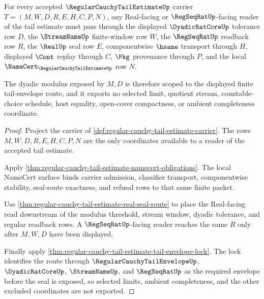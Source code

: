 \begin{theorem}
\label{thm:regular-cauchy-tail-estimate-dyadic-modulus-scope}
For every accepted $\RegularCauchyTailEstimateUp$ carrier
$T=(M,W,D,R,E,H,C,P,N)$, any Real-facing or $\RegSeqRatUp$-facing reader of the tail estimate must pass through the displayed $\DyadicRatCoreUp$ tolerance row $D$, the $\StreamNameUp$ finite-window row $W$, the $\RegSeqRatUp$ readback row $R$, the $\RealUp$ seal row $E$, componentwise $\hsame$ transport through $H$, displayed $\Cont$ replay through $C$, $\Pkg$ provenance through $P$, and the local $\NameCert_{\RegularCauchyTailEstimateUp}$ row $N$.

The dyadic modulus exposed by $M,D$ is therefore scoped to the displayed finite tail-envelope route, and it exports no selected limit, quotient stream, countable-choice schedule, host equality, open-cover compactness, or ambient completeness coordinate.
\end{theorem}
\begin{proof}
Project the carrier of \autoref{def:regular-cauchy-tail-estimate-carrier}. The rows $M,W,D,R,E,H,C,P,N$ are the only coordinates available to a reader of the accepted tail estimate.

Apply \autoref{thm:regular-cauchy-tail-estimate-namecert-obligations}. The local NameCert surface binds carrier admission, classifier transport, componentwise stability, seal-route exactness, and refusal rows to that same finite packet.

Use \autoref{thm:regular-cauchy-tail-estimate-real-seal-route} to place the Real-facing read downstream of the modulus threshold, stream window, dyadic tolerance, and regular readback rows. A $\RegSeqRatUp$-facing reader reaches the same $R$ only after $M,W,D$ have been displayed.

Finally apply \autoref{thm:regular-cauchy-tail-estimate-tail-envelope-lock}. The lock identifies the route through $\RegularCauchyTailEnvelopeUp$, $\DyadicRatCoreUp$, $\StreamNameUp$, and $\RegSeqRatUp$ as the required envelope before the seal is exposed, so selected limits, ambient completeness, and the other excluded coordinates are not exported.
\end{proof}

